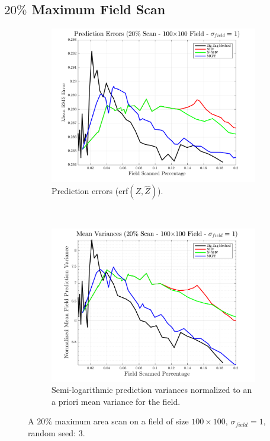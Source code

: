 \FloatBarrier
\clearpage
\subsection{$20\%$ Maximum Field Scan}
\begin{figure}[htb!]
    \centering
    \begin{subfigure}[t]{0.65\textwidth}
        \centering
        \includegraphics[width=\linewidth]{figures/hbresults/pred_errs_20p_100x100_sf_1_seed_3.png}
        \captionsetup{skip=0.20\baselineskip,size=footnotesize}
        \caption{Prediction errors (erf$(Z,\hat{Z})$).}
        \label{fig:prederrs_sigma1_p20_s3}
    \end{subfigure}%
    \\
    \begin{subfigure}[t]{0.65\textwidth}
        \centering
        \includegraphics[width=\linewidth]{figures/hbresults/vars_20p_100x100_sf_1_seed_3.png}
        \captionsetup{skip=0.20\baselineskip,size=footnotesize}
        \caption{Semi-logarithmic prediction variances normalized to an a priori mean variance for the field.}
        \label{fig:prederrs_sigma1_p20_s3}
    \end{subfigure}
    \captionsetup{skip=0.20\baselineskip}
    \caption{A $20\%$ maximum area scan on a field of size $100 \times 100$, $\sigma_{field} = 1$, random seed: 3.}
    \label{fig:sigma1_p20_s3}
\end{figure}

